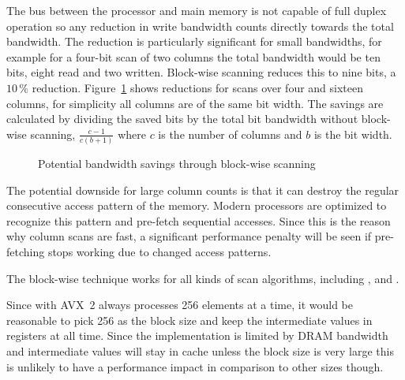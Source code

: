 The bus between the processor and main memory is not capable of full duplex
operation so any reduction in write bandwidth counts directly towards the total
bandwidth. The reduction is particularly significant for small bandwidths, for
example for a four-bit scan of two columns the total bandwidth would be ten
bits, eight read and two written. Block-wise scanning reduces this to nine
bits, a $10\,\%$ reduction. Figure~\ref{fig:blockwisesavings} shows reductions
for scans over four and sixteen columns, for simplicity all columns are of the
same bit width. The savings are calculated by dividing the saved bits by the
total bit bandwidth without block-wise scanning, $\frac{c-1}{c(b+1)}$ where $c$
is the number of columns and $b$ is the bit width.

\begin{figure}[h] \center
{}
\caption{Potential bandwidth savings through block-wise scanning}
\label{fig:blockwisesavings}
\end{figure}

The potential downside for large column counts is that it can destroy the
regular consecutive access pattern of the memory. Modern processors are
optimized to recognize this pattern and pre-fetch sequential accesses. Since
this is the reason why column scans are fast, a significant performance penalty
will be seen if pre-fetching stops working due to changed access patterns.

The block-wise technique works for all kinds of scan algorithms, including
\simdscan{}, \bwv{} and \bs{}.

Since \bwv{} with AVX~2 always processes 256 elements at a time, it would be
reasonable to pick 256 as the block size and keep the intermediate values in
registers at all time. Since the \bwv{} implementation is limited by DRAM
bandwidth and intermediate values will stay in cache unless the block size is
very large this is unlikely to have a performance impact in comparison to other
sizes though.
